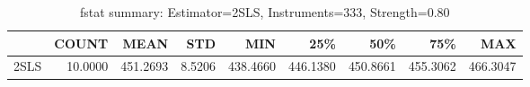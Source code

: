 \begin{table}[ht]
\centering
\caption{fstat summary: Estimator=2SLS, Instruments=333, Strength=0.80}
\begin{tabular}{lrrrrrrrr}
\toprule
 & COUNT & MEAN & STD & MIN & 25\% & 50\% & 75\% & MAX \\
\midrule
2SLS & 10.0000 & 451.2693 & 8.5206 & 438.4660 & 446.1380 & 450.8661 & 455.3062 & 466.3047 \\
\bottomrule
\end{tabular}
\end{table}
